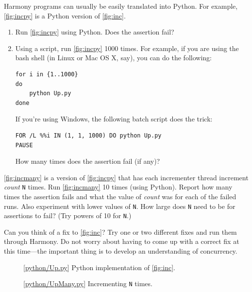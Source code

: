 \documentclass{report}
\newcommand{\harmonylink}[1]{%
[\href{https://www.cs.cornell.edu/home/rvr/harmony/#1}{\underline{#1}}]%
}
\newenvironment{code}{
\tcolorbox
}{
\endtcolorbox
}
\begin{document}
\begin{problems}
\item Harmony programs can usually be easily translated into Python.  For example,
\autoref{fig:incpy} is a Python version of \autoref{fig:inc}.
\begin{enumerate}
\item Run \autoref{fig:incpy} using Python.  Does the assertion fail?
\item Using a script, run \autoref{fig:incpy} 1000 times.
For example, if you are using the bash shell (in Linux or Mac OS X, say), you can do the following:
\begin{code}
\begin{verbatim}
for i in {1..1000}
do
    python Up.py
done
\end{verbatim}
\end{code}
If you're using Windows, the following batch script does the trick:
\begin{code}
\begin{verbatim}
FOR /L %%i IN (1, 1, 1000) DO python Up.py
PAUSE
\end{verbatim}
\end{code}
How many times does the assertion fail (if any)?
\end{enumerate}
\item \autoref{fig:incmany} is a version of \autoref{fig:incpy} that has each
incrementer thread increment \textit{count} \texttt{N} times.  Run \autoref{fig:incmany}
10 times (using Python).
Report how many times the assertion fails and what the value of \textit{count}
was for each of the failed runs.
Also experiment with lower values of \texttt{N}.
How large does \texttt{N} need to be for assertions to fail?
(Try powers of 10 for \texttt{N}.)
\item Can you think of a fix to \autoref{fig:inc}?  Try one or two different fixes
and run them through Harmony.  Do not worry about having to come up with a correct fix at this
time---the important thing is to develop an understanding of concurrency.
\end{problems}

\begin{figure}
\begin{code}
\end{code}
\caption{\harmonylink{python/Up.py} Python implementation of \autoref{fig:inc}.}
\label{fig:incpy}
\end{figure}

\begin{figure}
\begin{code}
\end{code}
\caption{\harmonylink{python/UpMany.py} Incrementing \texttt{N} times.}
\label{fig:incmany}
\end{figure}
\end{document}
